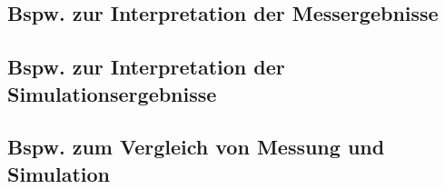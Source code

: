 %
\subsection{Bspw. zur Interpretation der Messergebnisse}
%
\lipsum[4]
%
%
%
%
\begin{flushright}
  \textit{\autorA}
\end{flushright}
%
%
%
\subsection{Bspw. zur Interpretation der Simulationsergebnisse}
%
\lipsum[6]
%
%
%
%
\begin{flushright}
  \textit{\autorA}
\end{flushright}
%
%
%
\subsection{Bspw. zum Vergleich von Messung und Simulation}
%
\lipsum[8]
%
%
%
%
\begin{flushright}
  \textit{\autorA}
\end{flushright}
%
%
%